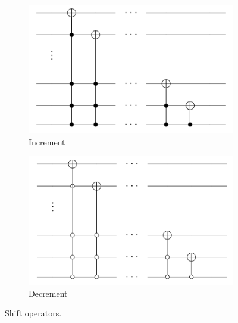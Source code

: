 \documentclass[dissertation.tex]{subfiles}
\begin{document}
\begin{figure}[!h]
  \centering
  \begin{subfigure}[t]{.4\textwidth}
    \centering
    \includegraphics[width=\linewidth]{img/QCircuit/CoinedQuantumWalk/DouglasWangIncrement.png}
    \caption{Increment}
  \end{subfigure}
  \begin{subfigure}[t]{.4\textwidth}
    \centering
    \includegraphics[width=\linewidth]{img/QCircuit/CoinedQuantumWalk/DouglasWangDecrement.png}
    \caption{Decrement}
  \end{subfigure}
  \caption{Shift operators.}
  \label{fig:circulantGraphs}
\end{figure}

\clearpage
\end{document}
